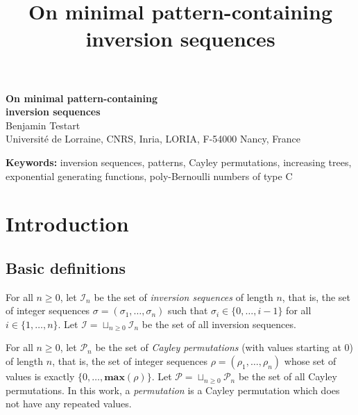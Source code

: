 \documentclass[a4paper,11pt]{article}
\title{On minimal pattern-containing inversion sequences}
\theoremstyle{definition}
\theoremstyle{remark}
\newcommand{\I}{\mathcal{I}}
\renewcommand{\P}{\mathcal{P}}
\renewcommand{\max}{\mathbf{max}}
\begin{document}
\setlength{\tabcolsep}{2pt}
\renewcommand{\arraystretch}{1.15}

\begin{center}
{\LARGE \textbf{On minimal pattern-containing \\ inversion sequences}} \\[20pt]
{\large Benjamin Testart} \\[10pt]
{\small Université de Lorraine, CNRS, Inria, LORIA, F-54000 Nancy, France} \\
\end{center}

 \medbreak

{\noindent \textbf{Keywords: }inversion sequences, patterns, Cayley permutations, increasing trees, exponential generating functions, poly-Bernoulli numbers of type C}

\section{Introduction}
\subsection{Basic definitions}
For all $n \geqslant 0$, let $\I_n$ be the set of \emph{inversion sequences} \cite{Corteel_Martinez_Savage_Weselcouch_2016, Mansour_Shattuck_2015} of length $n$, that is, the set of integer sequences $\sigma = (\sigma_1, \dots, \sigma_n)$ such that $\sigma_i \in \{0, \dots, i-1\}$ for all $i \in \{1, \dots, n\}$. Let $\I = \sqcup_{n \geqslant 0} \I_n$ be the set of all inversion sequences.

For all $n \geqslant 0$, let $\P_n$ be the set of \emph{Cayley permutations} \cite{Mor_Fraenkel_1984} (with values starting at 0) of length $n$, that is, the set of integer sequences $\rho = (\rho_1, \dots, \rho_n)$ whose set of values is exactly $\{0, \dots, \max(\rho)\}$. Let $\P = \sqcup_{n \geqslant 0} \P_n$ be the set of all Cayley permutations. In this work, a \emph{permutation} is a Cayley permutation which does not have any repeated values.
\end{document}
